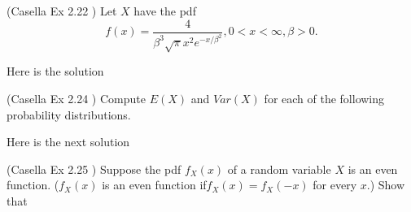 \documentclass[12pt,letterpaper]{exam}
\begin{document}
\begin{questions}
	\setcounter{question}{21}
	\question (Casella Ex 2.22 ) Let $X$ have the pdf $$ f(x) = \frac{4}{\beta^3\sqrt{\pi} x^2 e^{-x/\beta^2}}, 0 < x < \infty, \beta > 0.$$
	
	\begin{solution}
		Here is the solution
	\end{solution}
	
	\setcounter{question}{23}
	\question  (Casella Ex 2.24 ) Compute $E(X)$ and $Var(X)$ for each of the following probability distributions.
	
	\begin{solution}
		Here is the next solution
	\end{solution}

	\question (Casella Ex 2.25 ) Suppose the pdf  $f_X(x)$ of a random variable $X$ is an even function. ($f_X(x)$ is an even function if$f_X(x) = f_X(-x)$ for every $x$.) Show that 
	

\end{questions}
\end{document}
